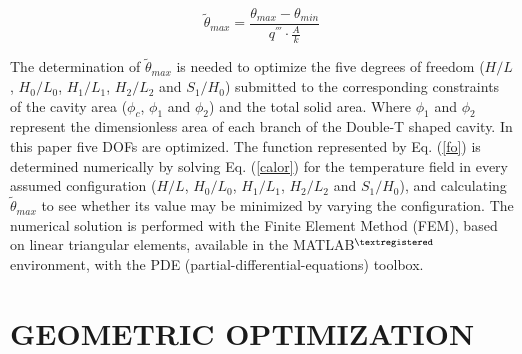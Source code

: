 \documentclass[12pt,fleqn]{article}
\begin{document}
\begin{equation}
\tilde{\theta}_{max}=\frac{\theta_{max}-\theta_{min}}{q^{'''}\cdot\frac{A}{k}}\label{fo}
\end{equation}

The determination of $\tilde{\theta}_{max}$ is needed to optimize the five degrees of freedom ($H/L$, $H_{0}/L_{0}$, $H_{1}/L_{1}$, $H_{2}/L_{2}$ and $S_{1}/H_{0}$) submitted to the corresponding constraints of the cavity area ($\phi_{c}$, $\phi_{1}$ and $\phi_{2}$) and the total solid area. Where $\phi_{1}$ and $\phi_{2}$ represent the dimensionless area of each branch of the Double-T shaped cavity. In this paper five DOFs are optimized. The function represented by Eq. (\ref{fo}) is determined numerically by solving Eq. (\ref{calor}) for the temperature field in every assumed configuration ($H/L$, $H_{0}/L_{0}$, $H_{1}/L_{1}$, $H_{2}/L_{2}$ and $S_{1}/H_{0}$), and calculating $\tilde{\theta}_{max}$ to see whether its value may be minimized by varying the configuration. The numerical solution is performed with the Finite Element Method (FEM)\citep{Reddy1994}, based on linear triangular elements, available in the MATLAB$^{\tiny ®}$ environment, with the PDE (partial-differential-equations) toolbox. 


\section{GEOMETRIC OPTIMIZATION}
\end{document}
